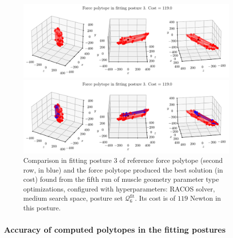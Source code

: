 \begin{figure}[!htb]
    \centering
    \captionsetup{justification=centering}
    
    \begin{minipage}{0.8\linewidth}
        \captionsetup{justification=centering}
        \centering
        \includegraphics[trim={0 0 0 0}, clip, width=1\linewidth]{img/chapter_4/reconstruction_stanford_imgs/polytope_racos_p6_points_medium_output_3207004_trial_5_fitting_posture_3.pdf}
    \end{minipage}
    \begin{minipage}{0.8\linewidth}
        \captionsetup{justification=centering}
        \centering
        \includegraphics[trim={0 0 0 20}, clip, width=1\linewidth]{img/chapter_4/reconstruction_stanford_imgs/polytope_racos_p6_points_medium_output_3207004_trial_5_fitting_posture_3_with_stanford.pdf}
    \end{minipage}
    \caption{Comparison in fitting posture 3 of reference force polytope (second row, in blue) and the force polytope produced the best solution (in cost) found from the fifth run of muscle geometry parameter type optimizations, configured with hyperparameters: RACOS solver, medium search space, posture set $\mathcal{Q}_6^{\text{fit}}$. Its cost is of $119$ Newton in this posture.}
    \label{fig:polytope_racos_p6_points_medium_output_3207004_trial_5_fitting_posture_3}
\end{figure}

\clearpage
\subsubsection*{Accuracy of computed polytopes in the fitting postures}


